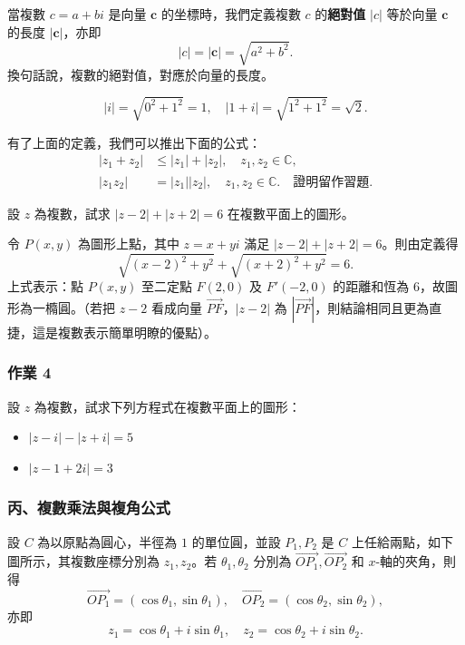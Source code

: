 \begin{definition}[複數的絕對值]
當複數 $c=a+bi$ 是向量 $\mathbf{c}$ 的坐標時，我們定義複數 $c$ 的\textbf{絕對值} $|c|$ 等於向量 $\mathbf{c}$ 的長度 $|\mathbf{c}|$，亦即
\[
|c| = |\mathbf{c}| = \sqrt{a^2+b^2}.
\]
換句話說，複數的絕對值，對應於向量的長度。
\end{definition}

\begin{example}
\[
|i| = \sqrt{0^2+1^2} = 1, \quad |1+i| = \sqrt{1^2+1^2} = \sqrt{2}.
\]
\end{example}

有了上面的定義，我們可以推出下面的公式：
\begin{align*}
|z_1+z_2| &\le |z_1|+|z_2|, \quad z_1, z_2 \in \mathbb{C}, \\
|z_1 z_2| &= |z_1||z_2|, \quad z_1, z_2 \in \mathbb{C}. \quad \text{證明留作習題.}
\end{align*}

\begin{example}
設 $z$ 為複數，試求 $|z-2|+|z+2|=6$ 在複數平面上的圖形。
\end{example}

\begin{solution}
令 $P(x, y)$ 為圖形上點，其中 $z=x+yi$ 滿足 $|z-2|+|z+2|=6$。則由定義得
\[
\sqrt{(x-2)^2+y^2} + \sqrt{(x+2)^2+y^2} = 6.
\]
上式表示：點 $P(x, y)$ 至二定點 $F(2, 0)$ 及 $F'(-2, 0)$ 的距離和恆為 $6$，故圖形為一橢圓。（若把 $z-2$ 看成向量 $\vec{PF}$，$|z-2|$ 為 $|\vec{PF}|$，則結論相同且更為直捷，這是複數表示簡單明瞭的優點）。 \qedhere
\end{solution}

\subsubsection*{作業 4}
設 $z$ 為複數，試求下列方程式在複數平面上的圖形：
\begin{itemize}
  \item[(i)] $|z-i|-|z+i|=5$
  \item[(ii)] $|z-1+2i|=3$
\end{itemize}


\subsubsection*{丙、複數乘法與複角公式}

設 $C$ 為以原點為圓心，半徑為 $1$ 的單位圓，並設 $P_1, P_2$ 是 $C$ 上任給兩點，如下圖所示，其複數座標分別為 $z_1, z_2$。若 $\theta_1, \theta_2$ 分別為 $\vec{OP_1}, \vec{OP_2}$ 和 $x$-軸的夾角，則得
\[
\vec{OP_1} = (\cos\theta_1, \sin\theta_1), \quad \vec{OP_2} = (\cos\theta_2, \sin\theta_2),
\]
亦即
\[
z_1 = \cos\theta_1+i\sin\theta_1, \quad z_2 = \cos\theta_2+i\sin\theta_2.
\]


